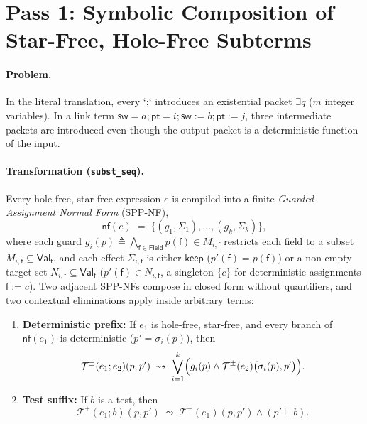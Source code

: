 \documentclass[11pt,a4paper]{article}
\theoremstyle{definition}
\theoremstyle{remark}
\newcommand{\Field}{\mathsf{Field}}
\newcommand{\Val}{\mathsf{Val}}
\begin{document}
\section{Pass 1: Symbolic Composition of Star-Free, Hole-Free Subterms}

\paragraph{Problem.}
In the literal translation, every `;` introduces an existential packet $\exists q$ ($m$ integer
variables). In a link term $\mathsf{sw} = a ; \mathsf{pt} = i ; \mathsf{sw} := b ; \mathsf{pt} := j$,
three intermediate packets are introduced even though the output packet is a deterministic function
of the input.

\paragraph{Transformation (\texttt{subst\_seq}).}
Every hole-free, star-free expression $e$ is compiled into a finite \emph{Guarded-Assignment Normal
Form} (SPP-NF),
\[
  \mathsf{nf}(e) \;=\; \bigl\{(g_1, \Sigma_1), \dots, (g_k, \Sigma_k)\bigr\},
\]
where each guard $g_i(p) \triangleq \bigwedge_{\mathsf{f} \in \Field} p(\mathsf{f}) \in M_{i,\mathsf{f}}$
restricts each field to a subset $M_{i,\mathsf{f}} \subseteq \Val_{\mathsf{f}}$, and each effect
$\Sigma_{i,\mathsf{f}}$ is either $\mathsf{keep}$ ($p'(\mathsf{f}) = p(\mathsf{f})$) or a non-empty
target set $N_{i,\mathsf{f}} \subseteq \Val_{\mathsf{f}}$ ($p'(\mathsf{f}) \in N_{i,\mathsf{f}}$, a
singleton $\{c\}$ for deterministic assignments $\mathsf{f} := c$). Two adjacent SPP-NFs compose in
closed form without quantifiers, and two contextual eliminations apply inside arbitrary terms:
\begin{enumerate}[label=(\arabic*)]
  \item \textbf{Deterministic prefix:} If $e_1$ is hole-free, star-free, and every branch of
        $\mathsf{nf}(e_1)$ is deterministic ($p' = \sigma_i(p)$), then
        \[
          \mathcal{T}^\pm(e_1 ; e_2)(p, p') \;\leadsto\;
          \bigvee_{i=1}^k \Bigl(g_i(p) \land \mathcal{T}^\pm(e_2)\bigl(\sigma_i(p), p'\bigr)\Bigr).
        \]
  \item \textbf{Test suffix:} If $b$ is a test, then
        \[
          \mathcal{T}^\pm(e_1 ; b)(p, p') \;\leadsto\;
          \mathcal{T}^\pm(e_1)(p, p') \land (p' \models b).
        \]
\end{enumerate}
\end{document}

